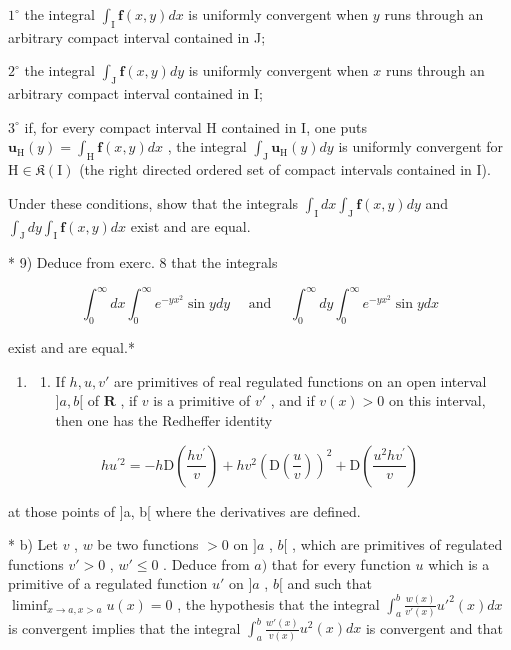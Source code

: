 \(1^{\circ}\) the integral \(\int_{\mathrm{I}}\mathbf{f}(x,y)dx\) is uniformly convergent when \(y\) runs through an arbitrary compact interval contained in J;

\(2^{\circ}\) the integral \(\int_{\mathrm{J}}\mathbf{f}(x,y)dy\) is uniformly convergent when \(x\) runs through an arbitrary compact interval contained in I;

\(3^{\circ}\) if, for every compact interval \(\mathrm{H}\) contained in I, one puts \(\mathbf{u}_{\mathrm{H}}(y) = \int_{\mathrm{H}} \mathbf{f}(x, y) dx\) , the integral \(\int_{\mathrm{J}} \mathbf{u}_{\mathrm{H}}(y) dy\) is uniformly convergent for \(\mathrm{H} \in \mathfrak{K}(\mathrm{I})\) (the right directed ordered set of compact intervals contained in I).

Under these conditions, show that the integrals \(\int_{\mathrm{I}} dx \int_{\mathrm{J}} \mathbf{f}(x, y) dy\) and \(\int_{\mathrm{J}} dy \int_{\mathrm{I}} \mathbf{f}(x, y) dx\) exist and are equal.

* 9) Deduce from exerc. 8 that the integrals

\[
\int_ {0} ^ {\infty} d x \int_ {0} ^ {\infty} e ^ {- y x ^ {2}} \sin y d y \quad \text { and } \quad \int_ {0} ^ {\infty} d y \int_ {0} ^ {\infty} e ^ {- y x ^ {2}} \sin y d x
\]

exist and are equal.*

\begin{enumerate}
\def\labelenumi{\arabic{enumi})}
\setcounter{enumi}{9}
\tightlist
\item
  \begin{enumerate}
  \def\labelenumii{\alph{enumii})}
  \tightlist
  \item
    If \(h, u, v'\) are primitives of real regulated functions on an open interval \(]a, b[\) of \(\mathbf{R}\) , if \(v\) is a primitive of \(v'\) , and if \(v(x) > 0\) on this interval, then one has the Redheffer identity
  \end{enumerate}
\end{enumerate}

\[
h u ^ {\prime 2} = - h \mathrm{D} \left(\frac {h v ^ {\prime}}{v}\right) + h v ^ {2} \left(\mathrm{D} \left(\frac {u}{v}\right)\right) ^ {2} + \mathrm{D} \left(\frac {u ^ {2} h v ^ {\prime}}{v}\right)
\]

at those points of {]}a, b{[} where the derivatives are defined.

* b) Let \(v\) , \(w\) be two functions \(> 0\) on \(]a\) , \(b[\) , which are primitives of regulated functions \(v' > 0\) , \(w' \leqslant 0\) . Deduce from \(a)\) that for every function \(u\) which is a primitive of a regulated function \(u'\) on \(]a\) , \(b[\) and such that \(\liminf_{x \to a, x > a} u(x) = 0\) , the hypothesis that the integral \(\int_{a}^{b} \frac{w(x)}{v'(x)} u'^2(x) dx\) is convergent implies that the integral \(\int_{a}^{b} \frac{w'(x)}{v(x)} u^2(x) dx\) is convergent and that

